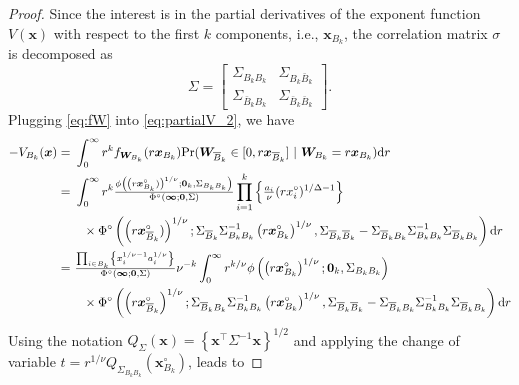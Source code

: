 \documentclass[12pt]{article}
\begin{document}
\begin{proof}
Since the interest is in the partial derivatives of the exponent function $V(\bm x)$ with respect to the first $k$ components, i.e.,  $\bm x_{B_k}$, the correlation matrix $\sigma$ is decomposed as
$$\Sigma = \begin{bmatrix}
 \Sigma_{B_k B_k} &  \Sigma_{B_k \bar{B}_k} \\
  \Sigma_{\bar{B}_k B_k} &  \Sigma_{\bar{B}_k \bar{B}_k}	
 \end{bmatrix}.
$$
Plugging \eqref{eq:fW} into \eqref{eq:partialV_2}, we have
%
\begin{align*}
 -V_{B_k}(\bm x) =&\ \int_0^\infty r^k f_{\bm W_{B_k}}(r \bm x_{B_k})  {\rm Pr}(\bm W_{{\overline{B}}_k} \in [0, r \bm x_{{\overline{B}}_k} ]\ | \ \bm W_{B_k} = r \bm x_{B_k} )\text dr \\
=&\ \int_0^\infty r^k {\textstyle{\phi\left( \left( r \bm x_{B_k}^\circ) \right)^{1/\nu}; \bm 0_{k}, \Sigma_{B_k B_k}\right)\over\Phi^\circ(\bm \infty;\bm 0, \Sigma)}} 
\prod_{i=1}^k \left\{ {\textstyle{a_i\over\nu}}(r x_i^\circ)^{1/\Delta-1} \right\} \\
&\quad \times \Phi^\circ \left( \left(r \bm x_{{\overline{B}}_k}^\circ)\right)^{1/\nu};
\Sigma_{{\overline{B}}_k}\Sigma_{B_k B_k}^{-1} \left(r \bm x_{B_k}^\circ\right)^{1/\nu},\Sigma_{{\overline{B}}_k{\overline{B}}_k}-\Sigma_{{\overline{B}}_k B_k}\Sigma_{B_k B_k}^{-1}\Sigma_{{\overline{B}}_k B_k} \right)  \text dr \\
=&\ {\textstyle{\prod_{i\in B_k} \left\{ x_i^{1/\nu-1}a_i^{1/\nu}\right\}\over\Phi^\circ(\bm \infty;\bm 0, \Sigma)}} \nu^{-k} \int_0^\infty r^{k/\nu} \phi\left( \left( r \bm x_{B_k}^\circ\right)^{1/\nu}; \bm 0_k, \Sigma_{B_k B_k}\right) \\
&\quad \times \Phi^\circ \left( \left(r \bm x_{{\overline{B}}_k}^\circ \right)^{1/\nu};
\Sigma_{{\overline{B}}_k B_k}\Sigma_{B_k B_k}^{-1} \left(r \bm x_{B_k}^\circ\right)^{1/\nu},\Sigma_{{\overline{B}}_k {\overline{B}}_k}-\Sigma_{{\overline{B}}_k B_k}\Sigma_{B_k B_k}^{-1}\Sigma_{{\overline{B}}_k B_k}\right) \text dr\\
\end{align*} 
%
Using the notation $Q_\Sigma \left( \bm x \right) = \left\{ \bm x^\top \Sigma^{-1} \bm x\right\}^{1/2}$ and applying the change of variable $t=r^{1/\nu}Q_{\Sigma_{B_k B_k}}(\bm x_{B_k}^\circ)$, leads to 


\end{proof}
\end{document}
